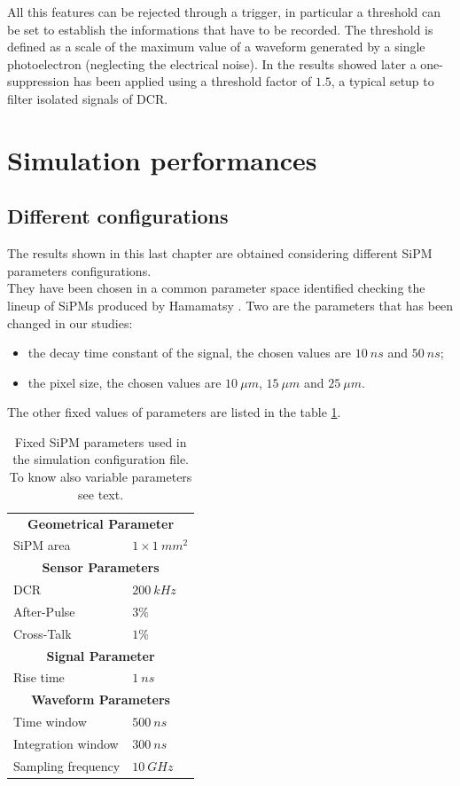 All this features can be rejected through a trigger, in particular a threshold can be set to establish the informations that have to be recorded.
The threshold is defined as a scale of the maximum value of a waveform generated by a single photoelectron (neglecting the electrical noise). In the results showed later a one-suppression has been applied using a threshold factor of $1.5$, a typical setup to filter isolated signals of DCR.\\

\section{Simulation performances} \label{sec:Sim_perf}

\subsection{Different configurations} \label{subsec:SiPM_conf}
The results shown in this last chapter are obtained considering different SiPM parameters configurations.\\
They have been chosen in a common parameter space identified checking the lineup of SiPMs produced by Hamamatsy \cite{SiPM_lineup}. 
Two are the parameters that has been changed in our studies: 
\begin{itemize}
	\item the decay time constant of the signal, the chosen values are $10\ ns$ and $50\ ns$;
	\item the pixel size, the chosen values are $10\ \mu m$, $15\ \mu m$ and $25\ \mu m$.
\end{itemize}

The other fixed values of parameters are listed in the table \ref{tab:SiPM_par}.\\

\begin{table}
	\centering
	\setlength{\tabcolsep}{18pt}
	\begin{tabular}{ll}
		\toprule
		\multicolumn{2}{c}{\textbf{Geometrical Parameter}}	\\
		SiPM area	& $1 \times 1\ mm^2$	\\
		\midrule
		\multicolumn{2}{c}{\textbf{Sensor Parameters}}	\\
		DCR			& $200 \ kHz$	\\
		After-Pulse	& $3\% $	\\
		Cross-Talk	& $1\% $	\\
		\midrule
		\multicolumn{2}{c}{\textbf{Signal Parameter}}	\\
		Rise time	& $1\ ns$	\\
		\midrule
		\multicolumn{2}{c}{\textbf{Waveform Parameters}}	\\
		Time window	& $500 \ ns$	\\
		Integration window	& $300 \ ns$	\\
		Sampling frequency	& $10\ GHz$	\\
		\bottomrule
	\end{tabular}
	\caption{Fixed SiPM parameters used in the simulation configuration file. To know also variable parameters see text.}
	\label{tab:SiPM_par}
\end{table}

